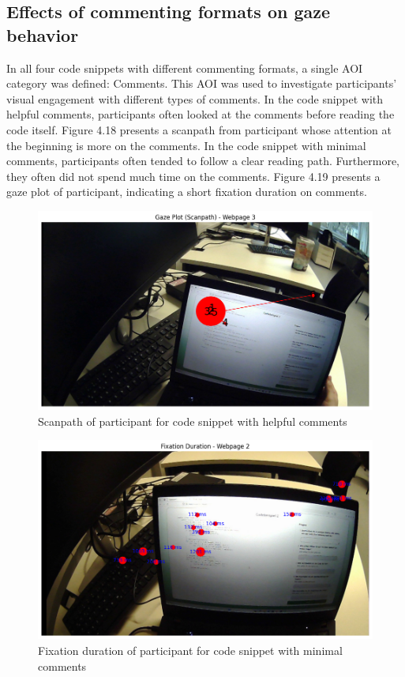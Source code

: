 \subsection{Effects of commenting formats on gaze behavior}

In all four code snippets with different commenting formats, a single AOI category was defined: Comments. This AOI was used to investigate participants’ visual engagement with different types of comments. In the code snippet with helpful comments, participants often looked at the comments before reading the code itself.  Figure 4.18 presents a scanpath from participant whose attention at the beginning is more on the comments. In the code snippet with minimal comments, participants often tended to follow a clear reading path.  Furthermore, they often did not spend much time on the comments. Figure 4.19  presents a gaze plot of participant, indicating a short fixation duration on comments. 

\begin{figure} [H]
  \centering
  \includegraphics[scale=0.6]{figures/h-com.png}
  \caption{Scanpath of participant for code snippet with helpful comments }
  \label{fig:AnhangsChor}
\end{figure}

\begin{figure} [H]
  \centering
  \includegraphics[scale=0.6]{figures/min-com.png}
  \caption{Fixation duration of participant for code snippet with minimal comments}
  \label{fig:AnhangsChor}
\end{figure}

